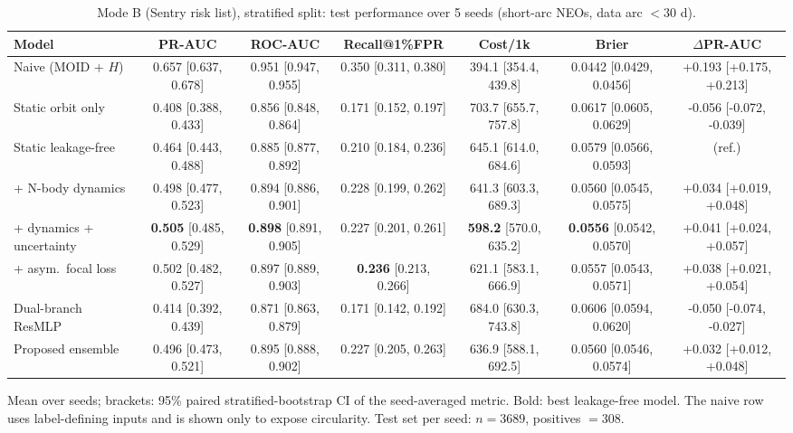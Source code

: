 \begin{table}[t]
\centering
\small
\caption{Mode B (Sentry risk list), stratified split: test performance over 5 seeds (short-arc NEOs, data arc $<30$ d).}
\label{tab:sentry_stratified_short_arc}
\begin{tabular}{lcccccc}
\toprule
Model & PR-AUC & ROC-AUC & Recall@1\%FPR & Cost/1k & Brier & $\Delta$PR-AUC \\
\midrule
Naive (MOID + $H$) & 0.657 \scriptsize{[0.637, 0.678]} & 0.951 \scriptsize{[0.947, 0.955]} & 0.350 \scriptsize{[0.311, 0.380]} & 394.1 \scriptsize{[354.4, 439.8]} & 0.0442 \scriptsize{[0.0429, 0.0456]} & +0.193 \scriptsize{[+0.175, +0.213]} \\
\midrule
Static orbit only & 0.408 \scriptsize{[0.388, 0.433]} & 0.856 \scriptsize{[0.848, 0.864]} & 0.171 \scriptsize{[0.152, 0.197]} & 703.7 \scriptsize{[655.7, 757.8]} & 0.0617 \scriptsize{[0.0605, 0.0629]} & -0.056 \scriptsize{[-0.072, -0.039]} \\
Static leakage-free & 0.464 \scriptsize{[0.443, 0.488]} & 0.885 \scriptsize{[0.877, 0.892]} & 0.210 \scriptsize{[0.184, 0.236]} & 645.1 \scriptsize{[614.0, 684.6]} & 0.0579 \scriptsize{[0.0566, 0.0593]} & (ref.) \\
+ N-body dynamics & 0.498 \scriptsize{[0.477, 0.523]} & 0.894 \scriptsize{[0.886, 0.901]} & 0.228 \scriptsize{[0.199, 0.262]} & 641.3 \scriptsize{[603.3, 689.3]} & 0.0560 \scriptsize{[0.0545, 0.0575]} & +0.034 \scriptsize{[+0.019, +0.048]} \\
+ dynamics + uncertainty & \textbf{0.505} \scriptsize{[0.485, 0.529]} & \textbf{0.898} \scriptsize{[0.891, 0.905]} & 0.227 \scriptsize{[0.201, 0.261]} & \textbf{598.2} \scriptsize{[570.0, 635.2]} & \textbf{0.0556} \scriptsize{[0.0542, 0.0570]} & +0.041 \scriptsize{[+0.024, +0.057]} \\
+ asym.\ focal loss & 0.502 \scriptsize{[0.482, 0.527]} & 0.897 \scriptsize{[0.889, 0.903]} & \textbf{0.236} \scriptsize{[0.213, 0.266]} & 621.1 \scriptsize{[583.1, 666.9]} & 0.0557 \scriptsize{[0.0543, 0.0571]} & +0.038 \scriptsize{[+0.021, +0.054]} \\
Dual-branch ResMLP & 0.414 \scriptsize{[0.392, 0.439]} & 0.871 \scriptsize{[0.863, 0.879]} & 0.171 \scriptsize{[0.142, 0.192]} & 684.0 \scriptsize{[630.3, 743.8]} & 0.0606 \scriptsize{[0.0594, 0.0620]} & -0.050 \scriptsize{[-0.074, -0.027]} \\
Proposed ensemble & 0.496 \scriptsize{[0.473, 0.521]} & 0.895 \scriptsize{[0.888, 0.902]} & 0.227 \scriptsize{[0.205, 0.263]} & 636.9 \scriptsize{[588.1, 692.5]} & 0.0560 \scriptsize{[0.0546, 0.0574]} & +0.032 \scriptsize{[+0.012, +0.048]} \\
\bottomrule
\end{tabular}
\par\vspace{2pt}\footnotesize Mean over seeds; brackets: 95\% paired stratified-bootstrap CI of the seed-averaged metric. Bold: best leakage-free model. The naive row uses label-defining inputs and is shown only to expose circularity. Test set per seed: $n=3689$, positives $=308$.
\end{table}
